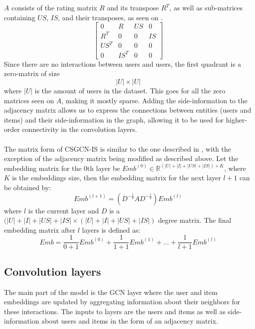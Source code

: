 $A$ consists of the rating matrix $R$ and its transpose $R^T$, as well as sub-matrices containing $US$, $IS$, and their transposes, as seen on .
\begin{equation}\label{csgcn_is_adj_mat}
    \begin{bmatrix}
    0 & R & US & 0\\
    R^T & 0 & 0 & IS\\
    US^T & 0 & 0 & 0 \\
    0 & IS^T & 0 & 0
    \end{bmatrix}
\end{equation}
Since there are no interactions between users and users, the first quadrant is a zero-matrix of size $$|U|\times|U|$$ where $|U|$ is the amount of users in the dataset.
This goes for all the zero matrices seen on $A$, making it mostly sparse.
Adding the side-information to the adjacency matrix allows us to express the connections between entities (users and items) and their side-information in the graph, allowing it to be used for higher-order connectivity in the convolution layers.
\\\\
The matrix form of CSGCN-IS is similar to the one described in \cite{LightGCN}, with the exception of the adjacency matrix being modified as described above.
Let the embedding matrix for the 0th layer be $Emb^{(0)} \in \mathbb{R}^{(|U| + |I| + |US| + |IS|) \times K}$, where $K$ is the embeddings size, then the embedding matrix for the next layer $l+1$ can be obtained by:
\begin{equation}
    Emb^{(l+1)} = (D^{-\frac{1}{2}}AD^{-\frac{1}{2}})Emb^{(l)}
\end{equation}
where $l$ is the current layer and $D$ is a $(|U| + |I| + |US| + |IS| \times (|U| + |I| + |US| + |IS|)$ degree matrix. 
The final embedding matrix after $l$ layers is defined as:
\begin{equation}
    Emb = \frac{1}{0 +1}Emb^{(0)} + \frac{1}{1 +1}Emb^{(1)} + ... + \frac{1}{l +1}Emb^{(l)}
\end{equation}


\subsection{Convolution layers}\label{subsec:csgcn_is_conv_layer}
The main part of the model is the GCN layer where the user and item embeddings are updated by aggregating information about their neighbors for these interactions.
The inputs to layers are the users and items as well as side-information about users and items in the form of an adjacency matrix.

